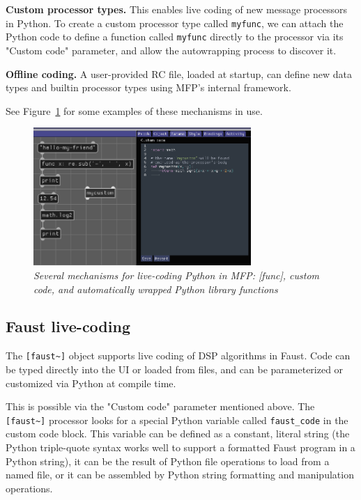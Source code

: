 \documentclass[a4paper]{article}
\def\:{\hskip0pt}
\begin{document}
{\bf Custom processor types.} This enables live coding of new
message processors in Python. To create a custom processor type
called {\tt myfunc}, we can attach the Python code to define a
function called {\tt myfunc} directly to the processor via its
"Custom code" parameter, and allow the autowrapping process to
discover it.

{\bf Offline coding.} A user\:-\:provided RC file, loaded at startup,
can define new data types and builtin processor types using MFP's
internal framework.

See Figure~\ref{fig:pythonlivecoding} for some examples of these
mechanisms in use.

\begin{figure}[ht]
\centerline{\includegraphics[width=3.25in]{python_livecoding.png}}
\caption{\label{fig:pythonlivecoding}{
    \it Several mechanisms for live-coding Python in MFP:
    [func], custom code, and automatically wrapped Python
    library functions
}}
\end{figure}

\subsection{Faust live-coding }

The {\tt [faust\textasciitilde]} object supports live coding of
DSP algorithms in Faust. Code can be typed directly into the UI
or loaded from files, and can be parameterized or customized via
Python at compile time.

This is possible via the "Custom code" parameter mentioned above.
The {\tt [faust\textasciitilde]} processor looks for a special
Python variable called {\tt faust\_code} in the custom code
block. This variable can be defined as a constant, literal string
(the Python triple\:-\:quote syntax works well to support a formatted
Faust program in a Python string), it can be the result of Python
file operations to load from a named file, or it can be assembled
by Python string formatting and manipulation operations.
\end{document}
